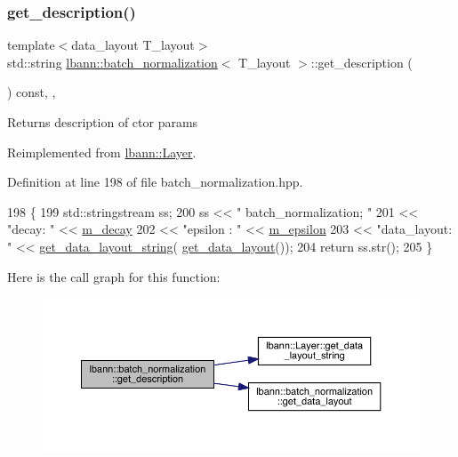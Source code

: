 \subsubsection{\texorpdfstring{get\+\_\+description()}{get\_description()}}
{\footnotesize\ttfamily template$<$data\+\_\+layout T\+\_\+layout$>$ \\
std\+::string \hyperlink{classlbann_1_1batch__normalization}{lbann\+::batch\+\_\+normalization}$<$ T\+\_\+layout $>$\+::get\+\_\+description (\begin{DoxyParamCaption}{ }\end{DoxyParamCaption}) const\hspace{0.3cm}{\ttfamily [inline]}, {\ttfamily [override]}, {\ttfamily [virtual]}}

Returns description of ctor params 

Reimplemented from \hyperlink{classlbann_1_1Layer_acc0803d3428914ca1eb5988c4309174a}{lbann\+::\+Layer}.



Definition at line 198 of file batch\+\_\+normalization.\+hpp.


\begin{DoxyCode}
198                                              \{
199     std::stringstream ss;
200     ss << \textcolor{stringliteral}{" batch\_normalization; "}
201        << \textcolor{stringliteral}{"decay: "} << \hyperlink{classlbann_1_1batch__normalization_aa2ee72d5efbf47c74796510ee61dbb14}{m\_decay}
202        << \textcolor{stringliteral}{"epsilon : "} << \hyperlink{classlbann_1_1batch__normalization_ab82e74f905b7a117d9940f8542451e37}{m\_epsilon}
203        << \textcolor{stringliteral}{"data\_layout: "} << \hyperlink{classlbann_1_1Layer_ae3f4a5602df821f4221614b1e3782dc1}{get\_data\_layout\_string}(
      \hyperlink{classlbann_1_1batch__normalization_ac97c038b9dec333a7fb285c196429e2d}{get\_data\_layout}());
204     \textcolor{keywordflow}{return} ss.str();
205   \}
\end{DoxyCode}
Here is the call graph for this function\+:\nopagebreak
\begin{figure}[H]
\begin{center}
\leavevmode
\includegraphics[width=350pt]{classlbann_1_1batch__normalization_a331738f02157f9e1e21f212c41feb86c_cgraph}
\end{center}
\end{figure}
\mbox{\label{classlbann_1_1batch__normalization_a1a773049354935cc2841bea8aa8bd94f}} 
